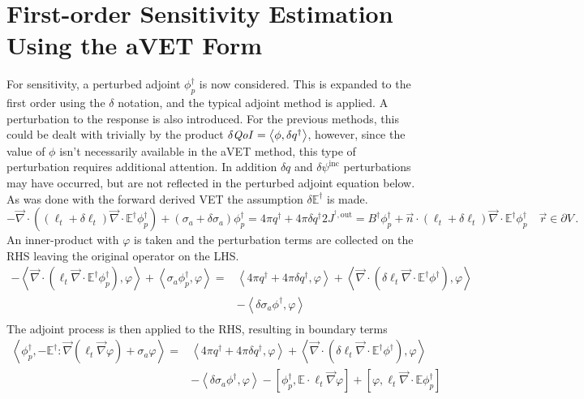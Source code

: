 \documentclass[12pt]{report}
\newcommand{\vr}{\vec{r}}
\newcommand{\bra}{\left\langle}
\newcommand{\ket}{\right\rangle}
\newcommand{\sbra}{\left[}
\newcommand{\sket}{\right]}
\renewcommand{\div}{\vec{\nabla} \cdot}
\newcommand{\grad}{\vec{\nabla}}
\newcommand{\bound}{\partial V}
\newcommand{\vn}{\vec{n}}
\newcommand{\Edd}{\mathbb{E}}
\newcommand{\BEdd}{B}
\newcommand{\siga}{\sigma_a}
\newcommand{\isigt}{\ell_t}
\newcommand{\scalResp}{q^\dag}
\newcommand{\qoi}{{\it QoI}\xspace}
\begin{document}
\section{First-order Sensitivity Estimation Using the aVET Form}
For sensitivity, a perturbed adjoint $\phi^\dag_p$ is now considered. This is expanded to the first order using the $\delta$ notation, and the typical adjoint method is applied. A perturbation to the response is also introduced. For the previous methods, this could be dealt with trivially by the product $\delta \qoi = \bra \phi , \delta q^\dag \ket$, however, since the value of $\phi$ isn't necessarily available in the aVET method, this type of perturbation requires additional attention. In addition $\delta q$ and $\delta \psi^{\text{inc}}$ perturbations may have occurred, but are not reflected in the perturbed adjoint equation below. As was done with the forward derived VET the assumption $\delta \Edd^\dag$ is made.
\begin{subequations}
\begin{equation}
- \div \left( (\isigt + \delta \isigt )\div \Edd^\dag \phi^\dag_p  \right)  +  (\siga + \delta \siga) \phi^\dag_p  =  4 \pi \scalResp + 4 \pi\delta \scalResp
\end{equation}
\begin{equation}
2 J^{^\dag,\text{out}} = \BEdd^\dag \phi^\dag_p  + \vn \cdot (\isigt + \delta \isigt) \div \Edd^\dag  \phi^\dag_p \quad \vr \in \bound \, .
\end{equation}
\end{subequations}
An inner-product with $\varphi$ is taken and the perturbation terms are collected on the RHS leaving the original operator on the LHS.
\begin{equation}
\begin{split}
- \bra\div \left( \isigt \div \Edd^\dag \phi^\dag_p  \right), \varphi \ket + \bra \siga  \phi^\dag_p , \varphi \ket  =& \bra 4 \pi \scalResp + 4 \pi\delta \scalResp , \varphi \ket + \bra\div \left( \delta \isigt \div \Edd^\dag \phi^\dag  \right), \varphi \ket \\ 
&- \bra \delta \siga \phi^\dag , \varphi \ket \\
\end{split}
\end{equation}
The adjoint process is then applied to the RHS, resulting in boundary terms
\begin{equation}
\label{AltVetPertDeriv}
\begin{split}
 \bra  \phi^\dag_p , -\Edd^\dag : \grad \left( \isigt \grad \varphi \right) + \siga  \varphi \ket  =& \bra 4 \pi \scalResp + 4 \pi\delta \scalResp , \varphi \ket + \bra\div \left( \delta \isigt \div \Edd^\dag \phi^\dag  \right), \varphi \ket \\ 
&- \bra \delta \siga \phi^\dag , \varphi \ket - \sbra \phi^\dag_p, \Edd \cdot \isigt \grad \varphi \sket + \sbra \varphi, \isigt \div \Edd \phi^\dag_p \sket  \\
\end{split}
\end{equation}
\end{document}
